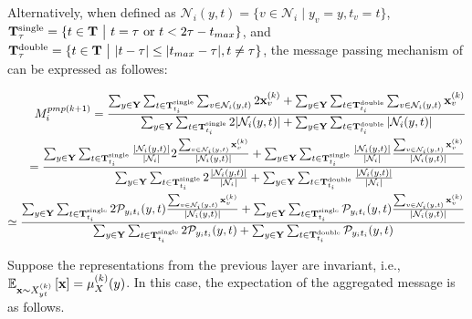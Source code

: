 Alternatively, when defined as $\mathcal{N}_i (y,t) = \{v \in \mathcal{N}_i \mid y_v=y, t_v=t \}$, $\bold{T}_{\tau}^{\text{single}}= \{t \in \bold{T}\ \big |\  t =\tau \text{ or }t<2\tau-t_{max}\}$, and $\bold{T}_{\tau}^{\text{double}}= \{t \in \bold{T}\ \big | \ |t- \tau| \le|t_{max}-\tau|, t\neq \tau\}$, the message passing mechanism of \PMP can be expressed as followes:

\begin{align}
M_{i}^{pmp(k+1)} = {\sum_{y\in \bold{Y}}\sum_{t\in\bold{T}_{t_i}^{\text{single}}}\sum_{v\in \mathcal{N}_{i}(y, t) }2\bold{x}_v^{(k)}+\sum_{y\in \bold{Y}}\sum_{t\in\bold{T}_{t_i}^{\text{double}}}\sum_{v\in \mathcal{N}_{i}(y, t) }\bold{x}_v^{(k)}\over \sum_{y\in \bold{Y}}\sum_{t\in\bold{T}_{t_i}^{\text{single}}}2|\mathcal{N}_{i}(y, t)|+\sum_{y\in \bold{Y}}\sum_{t\in\bold{T}_{t_i}^{\text{double}}}|\mathcal{N}_{i}(y, t)|}\\={\sum_{y\in \bold{Y}}\sum_{t\in\bold{T}_{t_i}^{\text{single}}}{|\mathcal{N}_i(y,t)|\over |\mathcal{N}_i|}2{\sum_{v\in \mathcal{N}_{i}(y, t) }\bold{x}_v^{(k)} \over |\mathcal{N}_i(y,t)|}+\sum_{y\in \bold{Y}}\sum_{t\in\bold{T}_{t_i}^{\text{single}}}{|\mathcal{N}_i(y,t)|\over |\mathcal{N}_i|}{\sum_{v\in \mathcal{N}_{i}(y, t) }\bold{x}_v^{(k)} \over |\mathcal{N}_i(y,t)|}\over \sum_{y\in \bold{Y}}\sum_{t\in\bold{T}_{t_i}^{\text{single}}}2{|\mathcal{N}_{i}(y, t)|\over| \mathcal{N}_i|}+\sum_{y\in \bold{Y}}\sum_{t\in\bold{T}_{t_i}^{\text{double}}}{|\mathcal{N}_{i}(y, t)|\over| \mathcal{N}_i|}}\\ \simeq {\sum_{y\in \bold{Y}}\sum_{t\in\bold{T}_{t_i}^{\text{single}}}2{\mathcal{P}_{y_i t_i}(y,t)}{\sum_{v\in \mathcal{N}_{i}(y, t) }\bold{x}_v^{(k)} \over |\mathcal{N}_i(y,t)|}+\sum_{y\in \bold{Y}}\sum_{t\in\bold{T}_{t_i}^{\text{single}}}{\mathcal{P}_{y_i t_i}(y,t)}{\sum_{v\in \mathcal{N}_{i}(y, t) }\bold{x}_v^{(k)} \over |\mathcal{N}_i(y,t)|}\over \sum_{y\in \bold{Y}}\sum_{t\in\bold{T}_{t_i}^{\text{single}}}2{\mathcal{P}_{y_i t_i}(y,t)}+\sum_{y\in \bold{Y}}\sum_{t\in\bold{T}_{t_i}^{\text{double}}}{\mathcal{P}_{y_i t_i}(y,t)}}
\end{align}

Suppose the representations from the previous layer are invariant, i.e., $\mathbb{E}_{\bold{x}\sim {X_{yt}^{(k)}}}\left[\bold{x}\right]=\mu_{X}^{(k)}(y)$. In this case, the expectation of the aggregated message is as follows.

